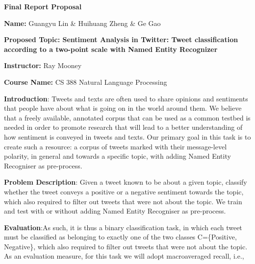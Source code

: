 \documentclass[12pt]{article}
\begin{document}
\thispagestyle{empty}


\centerline{\textbf{\Large{Final Report Proposal}}}

\bigskip


\noindent \textbf{Name:} %
Guangyu Lin \&
Huihuang Zheng \&
Ge Gao


\noindent \textbf{Proposed Topic:  Sentiment Analysis in Twitter: Tweet classification according to a two-point scale with Named Entity Recognizer} %


\noindent \textbf{Instructor:} %
Ray Mooney

\noindent \textbf{Course Name:}
CS 388 Natural Language Processing

\bigskip

\noindent \textbf{Introduction}: Tweets and texts are often used to share opinions and sentiments that people have about what is going on in the world around them. We believe that a freely available, annotated corpus that can be used as a common testbed is needed in order to promote research that will lead to a better understanding of how sentiment is conveyed in tweets and texts.  Our primary goal in this task is to create such a resource: a corpus of tweets marked with their message-level polarity, in general and towards a specific topic, with adding Named Entity Recogniser as pre-process.
\bigskip

\noindent \textbf{Problem Description}: Given a tweet known to be about a given topic, classify whether the tweet conveys a positive or a negative sentiment towards the topic, which also required to filter out tweets that were not about the topic. We train and test with or without adding Named Entity Recogniser as pre-process.

\bigskip

\noindent \textbf{Evaluation}:As such, it is thus a binary classification task, in which each tweet must be classified as belonging to exactly one of the two classes C=\{Positive, Negative\}, which also required to filter out tweets that were not about the topic. As an evaluation measure, for this task we will adopt macroaveraged recall, i.e.,
\end{document}
